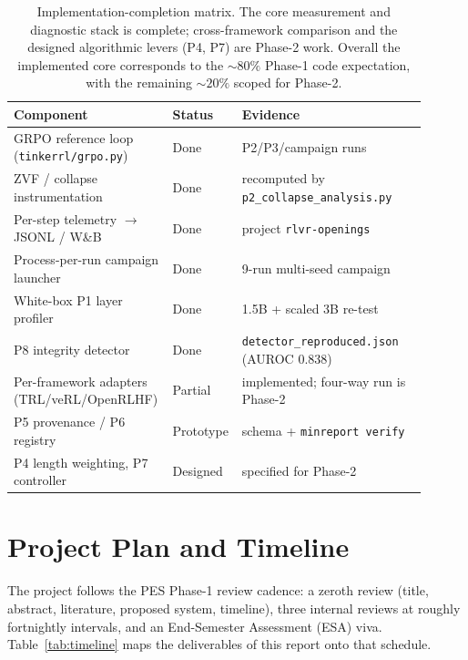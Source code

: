\documentclass[12pt,a4paper]{report}
\begin{document}
\begin{table}[h]
\centering\small
\begin{tabular}{@{}L{0.34\linewidth}L{0.12\linewidth}L{0.44\linewidth}@{}}
\toprule
\textbf{Component} & \textbf{Status} & \textbf{Evidence} \\
\midrule
GRPO reference loop (\texttt{tinkerrl/grpo.py}) & Done & P2/P3/campaign runs \\
ZVF / collapse instrumentation & Done & recomputed by \texttt{p2\_collapse\_analysis.py} \\
Per-step telemetry $\to$ JSONL / W\&B & Done & project \texttt{rlvr-openings} \\
Process-per-run campaign launcher & Done & 9-run multi-seed campaign \\
White-box P1 layer profiler & Done & 1.5B + scaled 3B re-test \\
P8 integrity detector & Done & \texttt{detector\_reproduced.json} (AUROC $0.838$) \\
Per-framework adapters (TRL/veRL/OpenRLHF) & Partial & implemented; four-way run is Phase-2 \\
P5 provenance / P6 registry & Prototype & schema + \texttt{minreport verify} \\
P4 length weighting, P7 controller & Designed & specified for Phase-2 \\
\bottomrule
\end{tabular}
\caption{Implementation-completion matrix. The core measurement and diagnostic stack is
complete; cross-framework comparison and the designed algorithmic levers (P4, P7) are
Phase-2 work. Overall the implemented core corresponds to the ${\sim}80\%$
Phase-1 code expectation, with the remaining ${\sim}20\%$ scoped for Phase-2.}
\label{tab:impl}
\end{table}

\section{Project Plan and Timeline}
The project follows the PES Phase-1 review cadence: a zeroth review (title, abstract,
literature, proposed system, timeline), three internal reviews at roughly fortnightly
intervals, and an End-Semester Assessment (ESA) viva. Table~\ref{tab:timeline} maps the
deliverables of this report onto that schedule.
\end{document}
